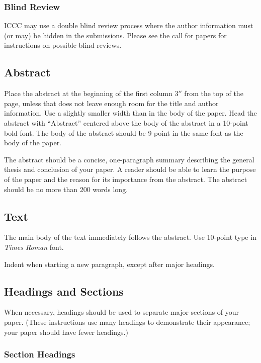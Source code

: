 \documentclass[letterpaper]{article}
\begin{document}
\subsubsection{Blind Review}

ICCC may use a double blind review process where the author information
must (or may) be hidden in the submissions. 
Please see the call for papers for instructions on possible blind reviews. 

\subsection{Abstract}

Place the abstract at the beginning of the first column 3$''$ from the
top of the page, unless that does not leave enough room for the title
and author information. Use a slightly smaller width than in the body
of the paper. Head the abstract with ``Abstract'' centered above the
body of the abstract in a 10-point bold font. The body of the abstract
should be 9-point in the same font as the body of the paper.

The abstract should be a concise, one-paragraph summary describing the
general thesis and conclusion of your paper. A reader should be able
to learn the purpose of the paper and the reason for its importance
from the abstract. The abstract should be no more than 200 words long.

\subsection{Text}

The main body of the text immediately follows the abstract. Use
10-point type in {\em Times Roman} font.

Indent when starting a new paragraph, except after major headings.

\subsection{Headings and Sections}

When necessary, headings should be used to separate major sections of
your paper. (These instructions use many headings to demonstrate their
appearance; your paper should have fewer headings.)

\subsubsection{Section Headings}
\end{document}
